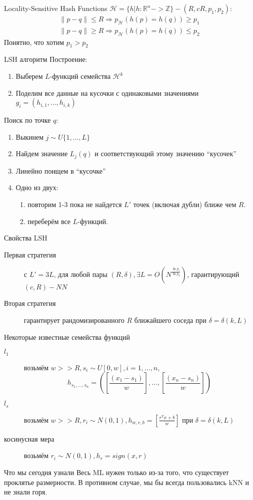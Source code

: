 \documentclass[14pt, fleqn, xcolor={dvipsnames, table}]{beamer}
\begin{document}
\begin{frame}{Locality-Sensitive Hash Functions}
$\mathcal{H} = \{h|h: \mathbb{R}^n -> \mathbb{Z}\} - (R,cR,p_1,p_2):$
$$\begin{array}{l}
  \|p-q\| \le R \Rightarrow p_{\mathcal{H}}(h(p)=h(q)) \ge p_1 \\
  \|p-q\| \ge R \Rightarrow p_{\mathcal{H}}(h(p)=h(q)) \le p_2
\end{array}$$
Понятно, что хотим $p_1 > p_2$
\end{frame}


\begin{frame}{LSH алгоритм}
\small
Построение:
\begin{enumerate}
  \item Выберем $L$-функций семейства $\mathcal{H}^k$
  \item Поделим все данные на кусочки с одинаковыми значениями $g_i = (h_{i,1},...,h_{i,k})$
\end{enumerate}
Поиск по точке $q$:
\begin{enumerate}
  \item Выкинем $j \sim U\{1,...,L\}$
  \item Найдем значение $L_j(q)$ и соответствующий этому значению “кусочек”
  \item Линейно поищем в “кусочке”
  \item Одно из двух:
  \begin{enumerate}
    \item повторим 1-3 пока не найдется $L'$ точек (включая дубли) ближе чем $R$.
    \item переберём все $L$-функций.
  \end{enumerate}
\end{enumerate}
\end{frame}


\begin{frame}{Свойства LSH}
\begin{description}
  \item [\color{blue}Первая стратегия]  с $L' = 3L$, для любой пары $(R, \delta), \exists L = O(N^{\frac{\ln p_1}{\ln p_2}} )$, гарантирующий $(c, R) - NN$
  \item [\color{blue}Вторая стратегия] гарантирует рандомизированного $R$ ближайшего соседа при $\delta = \delta(k, L)$
\end{description}
\end{frame}

\begin{frame}{Некоторые известные семейства функций}
\begin{description}
  \item [\color{blue}$l_1$] возьмём $w >> R, s_i \sim U[0, w], i=1,...,n$,
  $$
    h_{s_1,...,s_n} = ([\frac{(x_1 - s_1)}{w}], ..., [\frac{(x_n - s_n)}{w}])
  $$
  \item [\color{blue}$l_s$] возьмём $w >> R, r_i \sim N(0, 1), h_{w, r, b} = [\frac{r^Tx+b}{w}]$ при $\delta = \delta(k, L)$
  \item [\color{blue}косинусная мера] возьмём $r_i\sim N(0,1), h_r = sign(x,r)$
\end{description}
\end{frame}


\begin{frame}{Что мы сегодня узнали}
Весь ML нужен только из-за того, что существует проклятье размерности. В противном случае, мы бы всегда пользовались kNN и не знали горя.
\end{frame}
\end{document}
